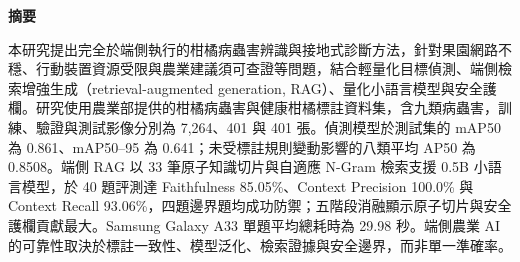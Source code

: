 \documentclass[10pt,twocolumn,a4paper]{article}
\begin{document}

\begin{center}\bfseries\fontsize{12}{18}\selectfont 摘要\end{center}
本研究提出完全於端側執行的柑橘病蟲害辨識與接地式診斷方法，針對果園網路不穩、行動裝置資源受限與農業建議須可查證等問題，結合輕量化目標偵測、端側檢索增強生成（retrieval-augmented generation, RAG）、量化小語言模型與安全護欄。研究使用農業部提供的柑橘病蟲害與健康柑橘標註資料集，含九類病蟲害，訓練、驗證與測試影像分別為 7,264、401 與 401 張。偵測模型於測試集的 mAP50 為 0.861、mAP50–95 為 0.641；未受標註規則變動影響的八類平均 AP50 為 0.8508。端側 RAG 以 33 筆原子知識切片與自適應 N-Gram 檢索支援 0.5B 小語言模型，於 40 題評測達 Faithfulness 85.05\%、Context Precision 100.0\% 與 Context Recall 93.06\%，四題邊界題均成功防禦；五階段消融顯示原子切片與安全護欄貢獻最大。Samsung Galaxy A33 單題平均總耗時為 29.98 秒。端側農業 AI 的可靠性取決於標註一致性、模型泛化、檢索證據與安全邊界，而非單一準確率。

\end{document}
